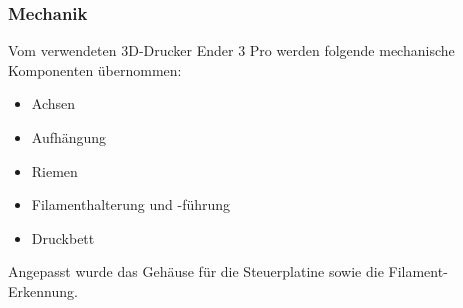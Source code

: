 \subsubsection{Mechanik}
\label{sec:Mechanik}

Vom verwendeten 3D-Drucker Ender 3 Pro werden folgende mechanische Komponenten übernommen:
\begin{itemize}
\item Achsen 
\item Aufhängung
\item Riemen
\item Filamenthalterung und -führung
\item Druckbett
\end{itemize}

Angepasst wurde das Gehäuse für die Steuerplatine sowie die Filament-Erkennung.




